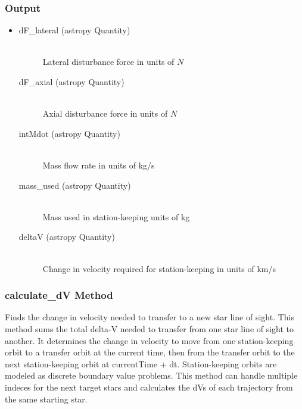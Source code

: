 \documentclass[cleanfoot]{asme2ej}
\begin{document}
\subsubsection*{Output}
\begin{itemize}
\item
\begin{description}
    \item[dF\_lateral (astropy Quantity)] \hfill \\ Lateral disturbance force in units of $N$
    \item[dF\_axial (astropy Quantity)] \hfill \\ Axial disturbance force in units of $N$
    \item[intMdot (astropy Quantity)] \hfill \\ Mass flow rate in units of kg/s
    \item[mass\_used (astropy Quantity)] \hfill \\ Mass used in station-keeping units of kg
    \item[deltaV (astropy Quantity)] \hfill \\ Change in velocity required for station-keeping in units of km/s
\end{description}
\end{itemize}

\subsubsection{calculate\_dV Method} \label{}
Finds the change in velocity needed to transfer to a new star line of sight. This method sums the total delta-V needed to transfer from one star line of sight to another. It determines the change in velocity to move from one station-keeping orbit to a transfer orbit at the current time, then from the transfer orbit to the next station-keeping orbit at currentTime + dt. Station-keeping orbits are modeled as discrete boundary value problems. This method can handle multiple indeces for the next target stars and calculates the dVs of each trajectory from the same starting star.
\end{document}
